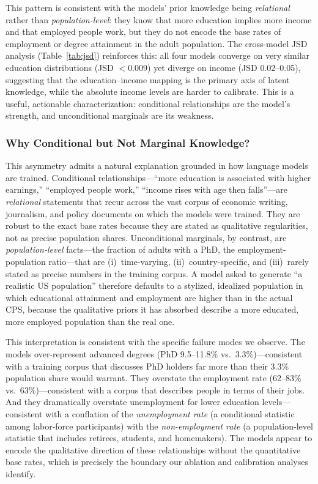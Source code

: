 \documentclass[11pt]{article}
\begin{document}
This pattern is consistent with the models' prior knowledge being \emph{relational} rather than \emph{population-level}: they know that more education implies more income and that employed people work, but they do not encode the base rates of employment or degree attainment in the adult population.
The cross-model JSD analysis (Table~\ref{tab:jsd}) reinforces this: all four models converge on very similar education distributions (JSD $< 0.009$) yet diverge on income (JSD 0.02--0.05), suggesting that the education--income mapping is the primary axis of latent knowledge, while the absolute income levels are harder to calibrate.
This is a useful, actionable characterization: conditional relationships are the model's strength, and unconditional marginals are its weakness.

\subsubsection{Why Conditional but Not Marginal Knowledge?}

This asymmetry admits a natural explanation grounded in how language models are trained.
Conditional relationships---``more education is associated with higher earnings,'' ``employed people work,'' ``income rises with age then falls''---are \emph{relational} statements that recur across the vast corpus of economic writing, journalism, and policy documents on which the models were trained.
They are robust to the exact base rates because they are stated as qualitative regularities, not as precise population shares.
Unconditional marginals, by contrast, are \emph{population-level} facts---the fraction of adults with a PhD, the employment-population ratio---that are (i)~time-varying, (ii)~country-specific, and (iii)~rarely stated as precise numbers in the training corpus.
A model asked to generate ``a realistic US population'' therefore defaults to a stylized, idealized population in which educational attainment and employment are higher than in the actual CPS, because the qualitative priors it has absorbed describe a more educated, more employed population than the real one.

This interpretation is consistent with the specific failure modes we observe.
The models over-represent advanced degrees (PhD 9.5--11.8\% vs.\ 3.3\%)---consistent with a training corpus that discusses PhD holders far more than their 3.3\% population share would warrant.
They overstate the employment rate (62--83\% vs.\ 63\%)---consistent with a corpus that describes people in terms of their jobs.
And they dramatically overstate unemployment for lower education levels---consistent with a conflation of the \emph{unemployment rate} (a conditional statistic among labor-force participants) with the \emph{non-employment rate} (a population-level statistic that includes retirees, students, and homemakers).
The models appear to encode the qualitative direction of these relationships without the quantitative base rates, which is precisely the boundary our ablation and calibration analyses identify.
\end{document}
